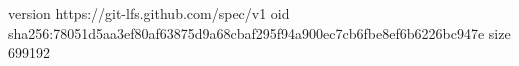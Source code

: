 version https://git-lfs.github.com/spec/v1
oid sha256:78051d5aa3ef80af63875d9a68cbaf295f94a900ec7cb6fbe8ef6b6226bc947e
size 699192
